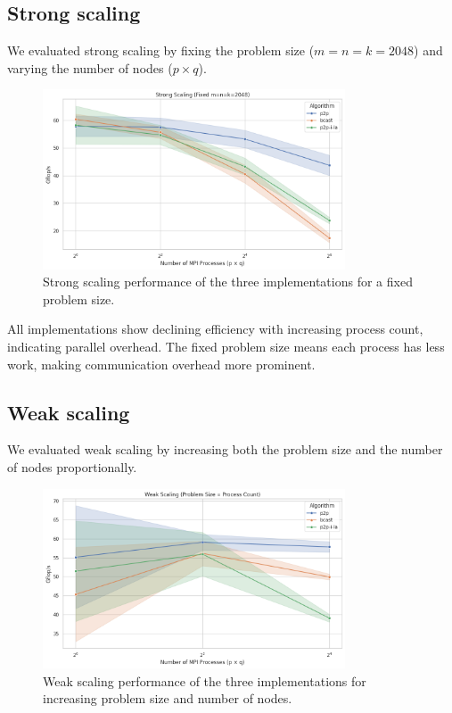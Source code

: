 \documentclass[12pt,a4paper]{article}
\begin{document}
\subsection{Strong scaling}

We evaluated strong scaling by fixing the problem size (\(m = n = k = 2048\)) and varying the number of nodes (\(p \times q\)).

\begin{figure}[H]
    \centering
    \includegraphics[width=0.8\textwidth]{src/strong_scaling.png}
    \caption{Strong scaling performance of the three implementations for a fixed problem size.}
    \label{fig:strong_scaling}     
\end{figure}

All implementations show declining efficiency with increasing process count, indicating parallel overhead.
The fixed problem size means each process has less work, making communication overhead more prominent.


\subsection{Weak scaling}

We evaluated weak scaling by increasing both the problem size and the number of nodes proportionally.

\begin{figure}[H]
    \centering
    \includegraphics[width=0.8\textwidth]{src/weak_scaling.png}
    \caption{Weak scaling performance of the three implementations for increasing problem size and number of nodes.}
    \label{fig:weak_scaling}
\end{figure}
\end{document}
